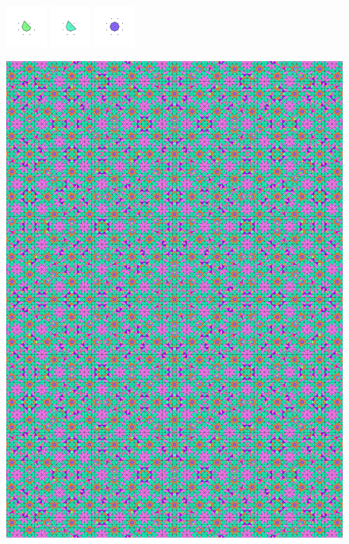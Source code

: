 \documentclass[text.tex]{subfiles}
\begin{document}
\begin{figure}[h!]
\includegraphics[width=0.12\textwidth]{img/results/octagon/octagon_224264_(-5_3alpha_1)_014.pdf}
\includegraphics[width=0.12\textwidth]{img/results/octagon/octagon_224264_(-5_3alpha_1)_015.pdf}
\includegraphics[width=0.12\textwidth]{img/results/octagon/octagon_224264_(-5_3alpha_1)_016.pdf}
\end{figure}

\begin{figure}[h!]
\centering
\includegraphics[width=1\textwidth]{img/results/octagon/quasi_polygon-octagon_224264_(-5_3alpha_1).pdf}
\end{figure}
\end{document}
